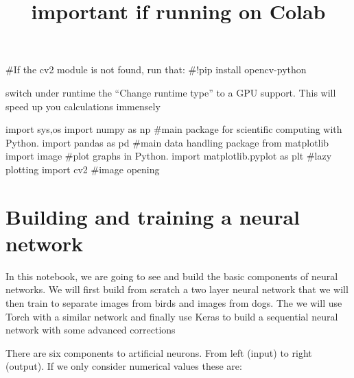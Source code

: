 \documentclass[
  letterpaper,
  DIV=11,
  numbers=noendperiod]{scrartcl}
\title{important if running on Colab}
\author{}
\date{}
\newenvironment{Shaded}{\begin{snugshade}}{\end{snugshade}}
\newcommand{\CommentTok}[1]{\textcolor[rgb]{0.37,0.37,0.37}{#1}}
\newcommand{\ImportTok}[1]{\textcolor[rgb]{0.00,0.46,0.62}{#1}}
\newcommand{\NormalTok}[1]{\textcolor[rgb]{0.00,0.23,0.31}{#1}}
\begin{document}
\maketitle


\begin{Shaded}
\begin{Highlighting}[]
\CommentTok{\#If the cv2 module is not found, run that:}
\CommentTok{\#!pip install opencv{-}python}
\end{Highlighting}
\end{Shaded}

switch under runtime the ``Change runtime type'' to a GPU support. This
will speed up you calculations immensely

\begin{Shaded}
\begin{Highlighting}[]
\ImportTok{import}\NormalTok{ sys,os}
\ImportTok{import}\NormalTok{ numpy }\ImportTok{as}\NormalTok{ np                     }\CommentTok{\#main package for scientific computing with Python.}
\ImportTok{import}\NormalTok{ pandas }\ImportTok{as}\NormalTok{ pd                    }\CommentTok{\#main data handling package}
\ImportTok{from}\NormalTok{ matplotlib }\ImportTok{import}\NormalTok{ image           }\CommentTok{\#plot graphs in Python.}
\ImportTok{import}\NormalTok{ matplotlib.pyplot }\ImportTok{as}\NormalTok{ plt        }\CommentTok{\#lazy plotting}
\ImportTok{import}\NormalTok{ cv2                             }\CommentTok{\#image opening}
\end{Highlighting}
\end{Shaded}

\section{Building and training a neural
network}\label{building-and-training-a-neural-network}

In this notebook, we are going to see and build the basic components of
neural networks. We will first build from scratch a two layer neural
network that we will then train to separate images from birds and images
from dogs. The we will use Torch with a similar network and finally use
Keras to build a sequential neural network with some advanced
corrections

There are six components to artificial neurons. From left (input) to
right (output). If we only consider numerical values these are:
\end{document}
